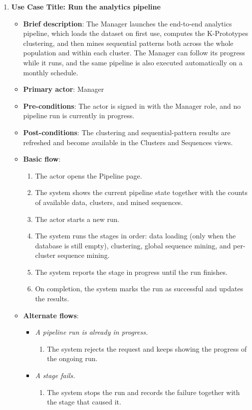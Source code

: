 \begin{enumerate}

\item \textbf{Use Case Title: Run the analytics pipeline}
\begin{itemize}
    \item \textbf{Brief description}: The Manager launches the end-to-end analytics pipeline, which loads the dataset on first use, computes the K-Prototypes clustering, and then mines sequential patterns both across the whole population and within each cluster. The Manager can follow its progress while it runs, and the same pipeline is also executed automatically on a monthly schedule.
    \item \textbf{Primary actor}: Manager
    \item \textbf{Pre-conditions}: The actor is signed in with the Manager role, and no pipeline run is currently in progress.
    \item \textbf{Post-conditions}: The clustering and sequential-pattern results are refreshed and become available in the Clusters and Sequences views.
    \item \textbf{Basic flow}:
    \begin{enumerate}
        \item The actor opens the Pipeline page.
        \item The system shows the current pipeline state together with the counts of available data, clusters, and mined sequences.
        \item The actor starts a new run.
        \item The system runs the stages in order: data loading (only when the database is still empty), clustering, global sequence mining, and per-cluster sequence mining.
        \item The system reports the stage in progress until the run finishes.
        \item On completion, the system marks the run as successful and updates the results.
    \end{enumerate}
    \item \textbf{Alternate flows}:
    \begin{itemize}
        \item[3a.] \textit{A pipeline run is already in progress.}
        \begin{enumerate}
            \item The system rejects the request and keeps showing the progress of the ongoing run.
        \end{enumerate}
        \item[4a.] \textit{A stage fails.}
        \begin{enumerate}
            \item The system stops the run and records the failure together with the stage that caused it.
        \end{enumerate}
    \end{itemize}
\end{itemize}


\end{enumerate}
